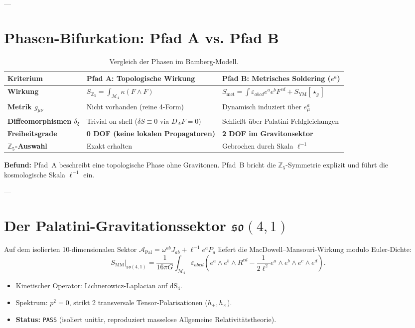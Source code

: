 \documentclass[11pt,a4paper]{article}
\begin{document}
---

\section{Phasen-Bifurkation: Pfad A vs. Pfad B}

\begin{table}[h!]
\centering
\small
\begin{tabular}{lp{6.2cm}p{6.2cm}}
\toprule
\textbf{Kriterium} & \textbf{Pfad A: Topologische Wirkung} & \textbf{Pfad B: Metrisches Soldering ($e^a$)} \\
\midrule
\textbf{Wirkung} & $S_{\mathbb{Z}_5} = \int_{\mathcal{M}_4} \kappa(F \wedge F)$ & $S_{\mathrm{met}} = \int \varepsilon_{abcd} e^a e^b F^{cd} + S_{\mathrm{YM}}[\star_g]$ \\
\textbf{Metrik $g_{\mu\nu}$} & Nicht vorhanden (reine 4-Form) & Dynamisch induziert über $e_\mu^a$ \\
\textbf{Diffeomorphismen $\delta_\xi$} & Trivial on-shell ($\delta S \equiv 0$ via $D_A F = 0$) & Schließt über Palatini-Feldgleichungen \\
\textbf{Freiheitsgrade} & \textbf{0 DOF (keine lokalen Propagatoren)} & \textbf{2 DOF im Gravitonsektor} \\
\textbf{$\mathbb{Z}_5$-Auswahl} & Exakt erhalten & Gebrochen durch Skala $\ell^{-1}$ \\
\bottomrule
\end{tabular}
\caption{Vergleich der Phasen im Bamberg-Modell.}
\end{table}

\textbf{Befund:} Pfad~A beschreibt eine topologische Phase ohne Gravitonen. Pfad~B bricht die $\mathbb{Z}_5$-Symmetrie explizit und führt die kosmologische Skala $\ell^{-1}$ ein.

---

\section{Der Palatini-Gravitationssektor $\mathfrak{so}(4,1)$}

Auf dem isolierten 10-dimensionalen Sektor $\mathcal{A}_{\mathrm{Pal}} = \omega^{ab} J_{ab} + \ell^{-1} e^a P_a$ liefert die MacDowell--Mansouri-Wirkung modulo Euler-Dichte:
\begin{equation}
S_{\mathrm{MM}}\big|_{\mathfrak{so}(4,1)} = \frac{1}{16\pi G} \int_{\mathcal{M}_4} \varepsilon_{abcd} \left( e^a \wedge e^b \wedge R^{cd} - \frac{1}{2\ell^2} e^a \wedge e^b \wedge e^c \wedge e^d \right).
\end{equation}
\begin{itemize}
    \item Kinetischer Operator: Lichnerowicz-Laplacian auf $\mathrm{dS}_4$.
    \item Spektrum: $p^2 = 0$, strikt 2 transversale Tensor-Polarisationen ($h_+, h_\times$).
    \item \textbf{Status:} \texttt{PASS} (isoliert unitär, reproduziert masselose Allgemeine Relativitätstheorie).
\end{itemize}
\end{document}
